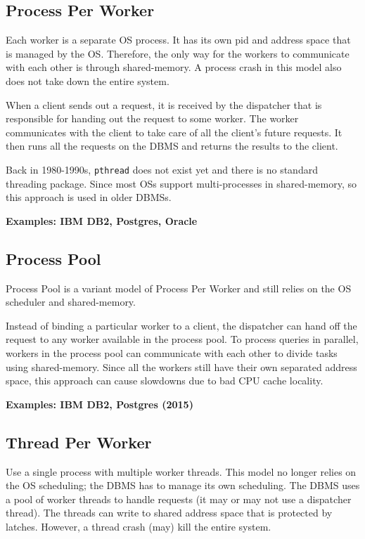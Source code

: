 \documentclass[11pt]{article}
\begin{document}
\subsection*{Process Per Worker}
Each worker is a separate OS process. It has its own pid and address space that is managed by the OS. Therefore, the only way for the workers to communicate with each other is through shared-memory. A process crash in this model also does not take down the entire system.

When a client sends out a request, it is received by the dispatcher that is responsible for handing out the request to some worker. The worker communicates with the client to take care of all the client's future requests. It then runs all the requests on the DBMS and returns the results to the client.

Back in 1980-1990s, \texttt{pthread} does not exist yet and there is no standard threading package. Since most OSs support multi-processes in shared-memory, so this approach is used in older DBMSs. 

\textbf{Examples: IBM DB2, Postgres, Oracle}

\subsection*{Process Pool}
Process Pool is a variant model of Process Per Worker and still relies on the OS scheduler and shared-memory. 

Instead of binding a particular worker to a client, the dispatcher can hand off the request to any worker available in the process pool. To process queries in parallel, workers in the process pool can communicate with each other to divide tasks using shared-memory. Since all the workers still have their own separated address space, this approach can cause slowdowns due to bad CPU cache locality.

\textbf{Examples: IBM DB2, Postgres (2015)}

\subsection*{Thread Per Worker}
Use a single process with multiple worker threads. This model no longer relies on the OS scheduling; the DBMS has to manage its own scheduling. The DBMS uses a pool of worker threads to handle requests (it may or may not use a dispatcher thread). The threads can write to shared address space that is protected by latches. However, a thread crash (may) kill the entire system.
\end{document}
